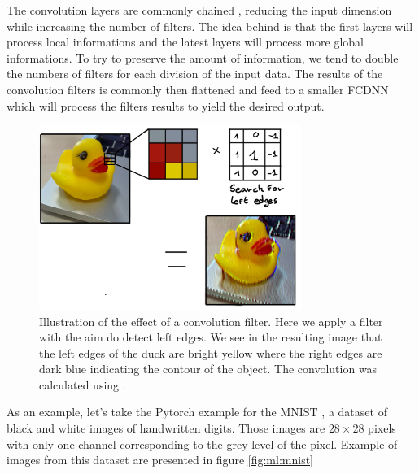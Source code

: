 \documentclass[../main.tex]{subfiles}
\begin{document}
The convolution layers are commonly chained \cite{simonyan_very_2015}, reducing the input dimension while increasing the number of filters. The idea behind is that the first layers will process local informations and the latest layers will process more global informations. To try to preserve the amount of information, we tend to double the numbers of filters for each division of the input data.
The results of the convolution filters is commonly then flattened and feed to a smaller FCDNN which will process the filters results to yield the desired output.

\begin{figure}[ht]
  \centering
  \includegraphics[height=6cm]{images/ml/convolution_exammple.jpg}
  \caption{Illustration of the effect of a convolution filter. Here we apply a filter with the aim do detect left edges. We see in the resulting image that the left edges of the duck are bright yellow where the right edges are dark blue indicating the contour of the object. The convolution was calculated using \cite{allen_generic-github-userimage-convolution-playground_2024}.}
  \label{fig:ml:conv_filter}
\end{figure}

As an example, let's take the Pytorch \cite{ansel_pytorch_2024} example for the MNIST \cite{lecun_gradient-based_1998}, a dataset of black and white images of handwritten digits. Those images are $28 \times 28$ pixels with only one channel corresponding to the grey level of the pixel. Example of images from this dataset are presented in figure \ref{fig:ml:mnist}
\end{document}
